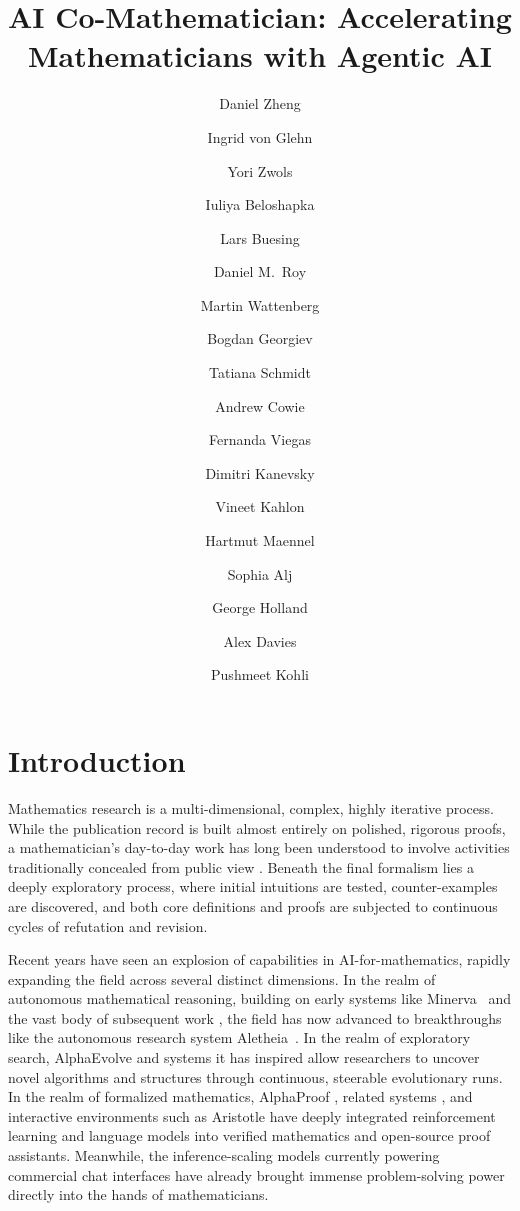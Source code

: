 \documentclass[11pt, a4paper, copyright, gdm]{google}
\title{{AI Co-Mathematician: Accelerating Mathematicians with Agentic AI}}
\author[1]{Daniel Zheng}
\author[1]{Ingrid von Glehn}
\author[1]{Yori Zwols}
\author[1]{Iuliya Beloshapka}
\author[1]{Lars Buesing}
\author[1]{Daniel M.~Roy}
\author[1]{Martin Wattenberg}
\author[1]{Bogdan Georgiev}
\author[1]{Tatiana Schmidt}
\author[1]{Andrew Cowie}
\author[1]{Fernanda Viegas}
\author[1]{Dimitri Kanevsky}
\author[2]{Vineet Kahlon}
\author[1]{Hartmut Maennel}
\author[1]{Sophia Alj}
\author[1]{George Holland}
\author[1]{Alex Davies}
\author[1]{Pushmeet Kohli}
\affil[1]{\thepa{}{}}
\affil[2]{Google}
\begin{document}
\maketitle

\section{Introduction}

Mathematics research is a multi-dimensional, complex, highly iterative process.
While the publication record is built almost entirely on polished, rigorous proofs, a mathematician's day-to-day work has long been understood to involve activities traditionally concealed from public view \citep{polya1954, lakatos1976, epstein1992}.
Beneath the final formalism lies a deeply exploratory process, where initial intuitions are tested, counter-examples are discovered, and both core definitions and proofs are subjected to continuous cycles of refutation and revision.

Recent years have seen an explosion of capabilities in AI-for-mathematics,
rapidly expanding the field across several distinct dimensions.
In the realm of autonomous mathematical reasoning, building on early systems like Minerva~\citep{lewkowycz2022minerva} and the vast body of subsequent work
\citep{taylor2022galactica,azerbayev2023llemma,yue2023mammoth,shao2024deepseekmath,mistral2024mathstral,yang2024qwen25math,lu2024aiscientist,deepthink2025,he2025skywork,yamada2025aiscientistv2,liu2025deepevolve,zimmer2026agentic}, the field has now advanced to breakthroughs like the autonomous research system Aletheia~\citep{feng2026}.
In the realm of exploratory search, AlphaEvolve \citep{romeraparedes2024, novikov2025} and systems it has inspired \citep{cemri2026adaevolve,sharma2025openevolve,lange2025shinkaevolve} allow researchers to uncover novel algorithms and structures through continuous, steerable evolutionary runs.
In the realm of formalized mathematics, AlphaProof \citep{hubert2025}, related systems \citep{song2024leancopilot, wang2024legoprover, ren2025deepseekproverv2, lin2025goedelproverv2, li2025lips, chen2025seedprover, wang2025kimina, hariharan2026milestoneformalizationspherepacking, li2024hunyuanprover, jana2025proofbridge, chen2026parity, liu2026numina, deltredici2025axprover},
and interactive environments such as Aristotle \citep{harmonic2025aristotle} have deeply integrated reinforcement learning and language models into verified mathematics and open-source proof assistants.
%
Meanwhile, 
%
the inference-scaling models currently powering commercial chat interfaces have already brought immense problem-solving power directly into the hands of mathematicians.
\end{document}
